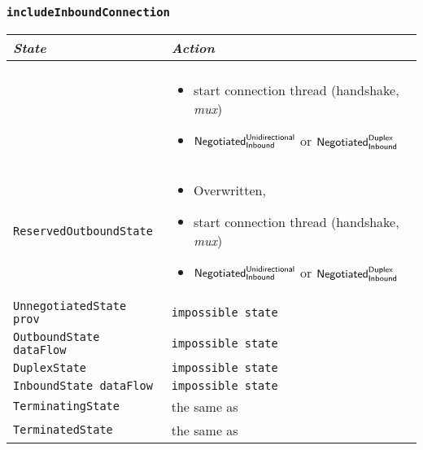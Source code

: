 \documentclass{article}
\def\InitialState{\textbullet}
\def\ReservedOutboundState{\texttt{ReservedOutboundState}}
\def\UnnegotiatedStateAny{\texttt{UnnegotiatedState prov}}
\def\OutboundStateAny{\texttt{OutboundState dataFlow}}
\def\DuplexState{\texttt{DuplexState}}
\def\InboundStateAny{\texttt{InboundState dataFlow}}
\def\TerminatingState{\texttt{TerminatingState}}
\def\TerminatedState{\texttt{TerminatedState}}
\def\Overwritten{\textsf{Overwritten}}
\def\NegotiatedUniIn{$\text{\textsf{Negotiated}}^\text{\textsf{Unidirectional}}_\text{\textsf{Inbound}}$}
\def\NegotiatedDupIn{$\text{\textsf{Negotiated}}^\text{\textsf{Duplex}}_\text{\textsf{Inbound}}$}
\def\mux{\textit{mux}}
\begin{document}
\subsubsection{\texttt{includeInboundConnection}}
\begin{center}
  \begin{tabular}[h]{ll}
    \textit{State}           & \textit{Action} \\\hline\\[2pt]
    \InitialState{}          &
      \begin{minipage}[t]{8cm}
        \begin{itemize}
          \item start connection thread (handshake, \mux{})
          \item \NegotiatedUniIn{} or \NegotiatedDupIn{}
        \end{itemize}
      \end{minipage}
      \vspace{8pt}\\
    \ReservedOutboundState{} &
      \begin{minipage}[t]{8cm}
        \begin{itemize}
          \item \Overwritten{},
          \item start connection thread (handshake, \mux{})
          \item \NegotiatedUniIn{} or \NegotiatedDupIn{}
        \end{itemize}
      \end{minipage}
      \vspace{8pt}\\
    \UnnegotiatedStateAny{}  & \texttt{impossible state} \\[8pt]
    \OutboundStateAny{}      & \texttt{impossible state} \\[8pt]
    \DuplexState{}           & \texttt{impossible state} \\[8pt]
    \InboundStateAny{}       & \texttt{impossible state} \\[8pt]
    \TerminatingState{}      & the same as \InitialState{} \\[8pt]
    \TerminatedState{}       & the same as \InitialState{} \\[8pt]
  \end{tabular}
\end{center}
\end{document}
